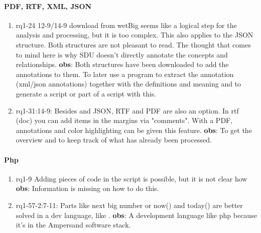 \paragraph{PDF, RTF, XML, JSON}
\begin{enumerate}
    \item rq1-24 12-9/14-9  download from wetBig seems like a logical step for the analysis and processing, but it is too complex.
    This also applies to the JSON structure.
    Both structures are not pleasant to read.
    The thought that comes to mind here is why SDU doesn't directly annotate the concepts and relationships.
    \newline\textbf{obs}: Both structures have been downloaded to add the annotations to them.
    To later use a program to extract the annotation (xml/json annotations) together with the definitions and meaning and to generate a script or part of a script with this.

    \item rq1-31:14-9: Besides  and {JSON}, {RTF} and {PDF} are also an option.
    In rtf (doc) you can add items in the margins via "comments".
    With a PDF, annotations and color highlighting can be given this feature.
    \newline\textbf{obs}: To get the overview and to keep track of what has already been processed.
    
\end{enumerate}

\paragraph{Php}
\begin{enumerate}
    \item rq1-9 Adding pieces of  code in the script is possible, but it is not clear how
    \newline\textbf{obs}: Information is missing  on how to do this.
     
    \item rq1-57-2:7-11: Parts like next big number or now() and today() are better solved in a dev language, like .
    \newline\textbf{obs}: A development language like php because it's in the Ampersand software stack.

\end{enumerate}

